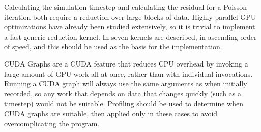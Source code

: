 
Calculating the simulation timestep and calculating the residual for a Poisson iteration both require a reduction over large blocks of data.
Highly parallel GPU optimizations have already been studied extensively, so it is trivial to implement a fast generic reduction kernel.
In \cite{CUDAParallelReduction} seven kernels are described, in ascending order of speed, and this should be used as the basis for the implementation.

CUDA Graphs \cite{GrayCUDAGraph2019Blog} are a CUDA feature that reduces CPU overhead by invoking a large amount of GPU work all at once, rather than with individual invocations.
Running a CUDA graph will always use the same arguments as when initially recorded, so any work that depends on data that changes quickly (such as a timestep) would not be suitable.
Profiling should be used to determine when CUDA graphs are suitable, then applied only in these cases to avoid overcomplicating the program.
